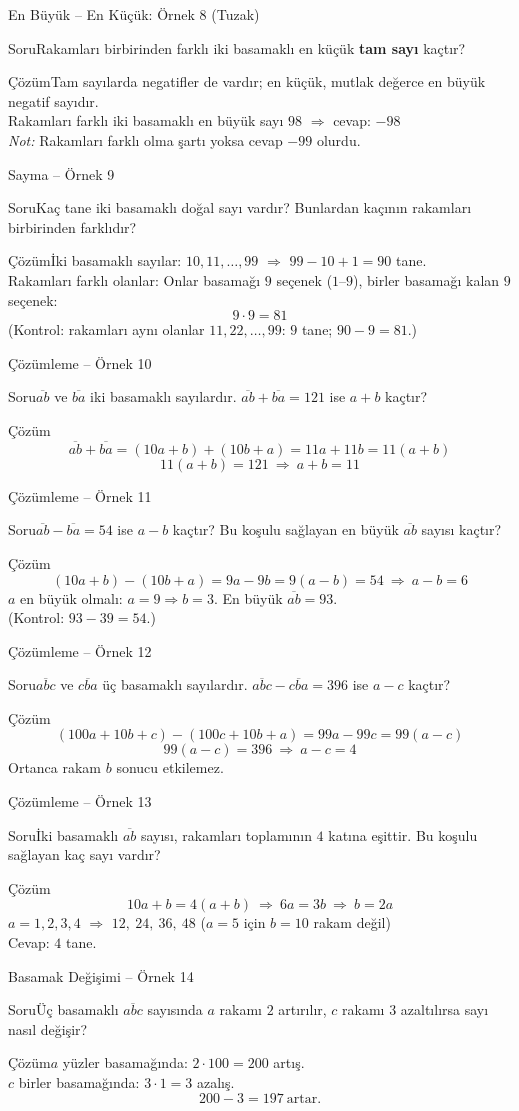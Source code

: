 \documentclass[aspectratio=169,11pt,handout]{beamer}
\newcommand{\soru}[3]{%
\begin{frame}{#1}
  \begin{block}{Soru}\large #2\end{block}
  \pause
  \begin{exampleblock}{Çözüm}\large #3\end{exampleblock}
\end{frame}}
\newcommand{\ab}[1]{\overline{#1}}
\begin{document}
\soru{En Büyük -- En Küçük: Örnek 8 (Tuzak)}
{Rakamları birbirinden farklı iki basamaklı en küçük \textbf{tam sayı} kaçtır?}
{Tam sayılarda negatifler de vardır; en küçük, mutlak değerce en büyük negatif sayıdır.\\[3pt]
Rakamları farklı iki basamaklı en büyük sayı \(98\) \(\Rightarrow\) cevap: \(-98\)\\[3pt]
\textit{Not:} Rakamları farklı olma şartı yoksa cevap \(-99\) olurdu.}

\soru{Sayma -- Örnek 9}
{Kaç tane iki basamaklı doğal sayı vardır? Bunlardan kaçının rakamları birbirinden farklıdır?}
{İki basamaklı sayılar: \(10,11,\dots,99\) \(\Rightarrow\) \(99-10+1=90\) tane.\\[3pt]
Rakamları farklı olanlar: Onlar basamağı \(9\) seçenek (\(1\)--\(9\)), birler basamağı kalan \(9\) seçenek:
\[9\cdot 9=81\]
(Kontrol: rakamları aynı olanlar \(11,22,\dots,99\): \(9\) tane; \(90-9=81\).)}

\soru{Çözümleme -- Örnek 10}
{\(\ab{ab}\) ve \(\ab{ba}\) iki basamaklı sayılardır. \(\ab{ab}+\ab{ba}=121\) ise \(a+b\) kaçtır?}
{\[\ab{ab}+\ab{ba}=(10a+b)+(10b+a)=11a+11b=11(a+b)\]
\[11(a+b)=121\ \Rightarrow\ a+b=11\]}

\soru{Çözümleme -- Örnek 11}
{\(\ab{ab}-\ab{ba}=54\) ise \(a-b\) kaçtır? Bu koşulu sağlayan en büyük \(\ab{ab}\) sayısı kaçtır?}
{\[(10a+b)-(10b+a)=9a-9b=9(a-b)=54\ \Rightarrow\ a-b=6\]
\(a\) en büyük olmalı: \(a=9\Rightarrow b=3\). \quad En büyük \(\ab{ab}=93\).\\[3pt]
(Kontrol: \(93-39=54\).)}

\soru{Çözümleme -- Örnek 12}
{\(\ab{abc}\) ve \(\ab{cba}\) üç basamaklı sayılardır. \(\ab{abc}-\ab{cba}=396\) ise \(a-c\) kaçtır?}
{\[(100a+10b+c)-(100c+10b+a)=99a-99c=99(a-c)\]
\[99(a-c)=396\ \Rightarrow\ a-c=4\]
Ortanca rakam \(b\) sonucu etkilemez.}

\soru{Çözümleme -- Örnek 13}
{İki basamaklı \(\ab{ab}\) sayısı, rakamları toplamının \(4\) katına eşittir. Bu koşulu sağlayan kaç sayı vardır?}
{\[10a+b=4(a+b)\ \Rightarrow\ 6a=3b\ \Rightarrow\ b=2a\]
\(a=1,2,3,4\) \(\Rightarrow\) \(12,\ 24,\ 36,\ 48\) \quad (\(a=5\) için \(b=10\) rakam değil)\\[3pt]
Cevap: \(4\) tane.}

\soru{Basamak Değişimi -- Örnek 14}
{Üç basamaklı \(\ab{abc}\) sayısında \(a\) rakamı \(2\) artırılır, \(c\) rakamı \(3\) azaltılırsa sayı nasıl değişir?}
{\(a\) yüzler basamağında: \(2\cdot 100=200\) artış.\\
\(c\) birler basamağında: \(3\cdot 1=3\) azalış.
\[200-3=197\ \text{artar.}\]}
\end{document}

